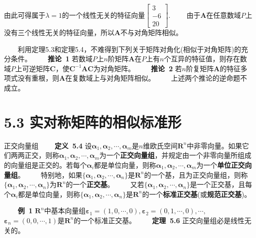 \documentclass[compress,mathserif,cjk]{beamer}
\theoremstyle{remark}
\numberwithin{equation}{section}
\newcommand{\hei}{\bf}      %
\begin{document}
\begin{CJK}{UTF8}{gbsn}
\begin{frame}
由此可得属于$\lambda=1$的一个线性无关的特征向量$\left[\begin{matrix}3\\-6\\20\end{matrix}\right].$
\pause\vskip 5pt
\ \ \ \ 由于$\bm A$在任意数域$P$上没有三个线性无关的特征向量，所以$\bm A$不与对角矩阵相似。

\end{frame}
\begin{frame}
\ \ \ \ 利用定理5.3和定理5.4，不难得到下列关于矩阵对角化(相似于对角矩阵)的充分条件。
\vskip 5pt
\ \ \ \ {\hei 推论~1} 若数域$P$上$n$阶矩阵$\bm A$在$P$上有$n$个互异的特征值，则存在数域$P$上可逆矩阵$\bm C$，使$\bm C^{-1}\bm{AC}$为对角矩阵。
\pause\vskip 5pt
\ \ \ \ {\hei 推论~2} 若$n$阶复矩阵$\bm A$的特征多项式没有重根，则$\bm A$在复数域上与对角矩阵相似。
\vskip 10pt
\ \ \ \ 上述两个推论的逆命题不成立。
\end{frame}

\section[5.3]{5.3 实对称矩阵的相似标准形}

\begin{frame}{正交向量组}
\ \ \ \ {\hei 定义~5.4} 设$\bm\alpha_1,\bm\alpha_2,\cdots,\bm\alpha_m$是$n$维欧氏空间$\mathbf R^n$中非零向量。如果它们两两正交，则称$\bm\alpha_1,\bm\alpha_2,\cdots,\bm\alpha_m$为一个{\hei 正交向量组}，并规定由一个非零向量所组成的向量组是正交的。若每个$\bm\alpha_i$都是单位向量，则称$\bm\alpha_1,\bm\alpha_2,\cdots,\bm\alpha_m$为一个{\hei 单位正交向量组}。
\pause\vskip 2pt
\ \ \ \ 特别地，如果$\{\bm\alpha_1,\bm\alpha_2,\cdots,\bm\alpha_n\}$是$\mathbf R^n$的一个基，且为正交向量组，则称$\{\bm\alpha_1,\bm\alpha_2,\cdots,\bm\alpha_n\}$为$\mathbf R^n$的一个{\hei 正交基}。
\pause\vskip 2pt
\ \ \ \ 又若$\{\bm\alpha_1,\bm\alpha_2,\cdots,\bm\alpha_n\}$是一个正交基，且每个$\bm\alpha_i$都是单位向量，则称$\{\bm\alpha_1,\bm\alpha_2,\cdots,\bm\alpha_n\}$是$\mathbf R^n$的一个{\hei 标准正交基}(或{\hei 规范正交基})。
\end{frame}
\begin{frame}
\ \ \ \ {\hei 例~1} $\mathbf R^n$中基本向量组$\bm\varepsilon_1=(1,0,\cdots,0), \bm\varepsilon_2=(0,1,\cdots,0),\cdots,$ $\bm\varepsilon_n=(0,0,\cdots,1)$是$\mathbf R^n$的一个标准正交基。
\pause\vskip 10pt
\ \ \ \ {\hei 定理~5.6} 正交向量组必是线性无关的。

\end{frame}


\end{CJK}
\end{document}
